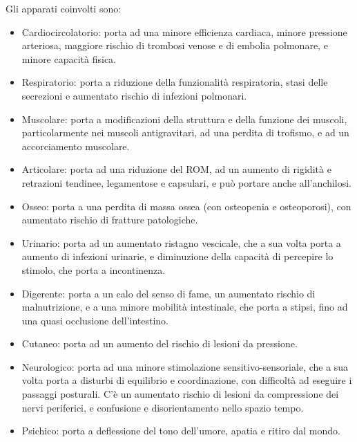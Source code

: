 Gli apparati coinvolti sono:
\begin{itemize}
 \item Cardiocircolatorio: porta ad una minore efficienza cardiaca, minore 
pressione arteriosa, maggiore rischio di trombosi venose e di embolia 
polmonare, e minore capacità fisica.
 \item Respiratorio: porta a riduzione della funzionalità respiratoria, stasi 
delle secrezioni e aumentato rischio di infezioni polmonari.
 \item Muscolare: porta a modificazioni della struttura e della funzione dei 
muscoli, particolarmente nei muscoli antigravitari, ad una perdita di trofismo, 
e ad un accorciamento muscolare.
 \item Articolare: porta ad una riduzione del ROM, ad un aumento di rigidità e 
retrazioni tendinee, legamentose e capsulari, e può portare anche all'anchilosi.
 \item Osseo: porta a una perdita di massa ossea (con osteopenia e 
osteoporosi), con aumentato rischio di fratture patologiche.
 \item Urinario: porta ad un aumentato ristagno vescicale, che a sua volta 
porta a aumento di infezioni urinarie, e diminuzione della capacità di 
percepire lo stimolo, che porta a incontinenza.
 \item Digerente: porta a un calo del senso di fame, un aumentato rischio di 
malnutrizione, e a una minore mobilità intestinale, che porta a stipsi, fino ad 
una quasi occlusione dell'intestino.
 \item Cutaneo: porta ad un aumento del rischio di lesioni da pressione.
 \item Neurologico: porta ad una minore stimolazione sensitivo-sensoriale, che 
a sua volta porta a disturbi di equilibrio e coordinazione, con difficoltà ad 
eseguire i passaggi posturali. C'è un aumentato rischio di lesioni da 
compressione dei nervi periferici, e confusione e disorientamento nello spazio 
tempo.
 \item Psichico: porta a deflessione del tono dell'umore, apatia e ritiro dal 
mondo.
\end{itemize}

